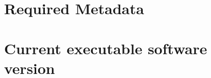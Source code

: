 \documentclass[
	fontsize=11pt, %
	twoside=false, %
	open=any, %
	secnumdepth=1, %
]{kaobook}
\begin{document}
\begin{widepar}





\end{widepar}





\clearpage
\section*{Required Metadata}

\section*{Current executable software version}
\end{document}
